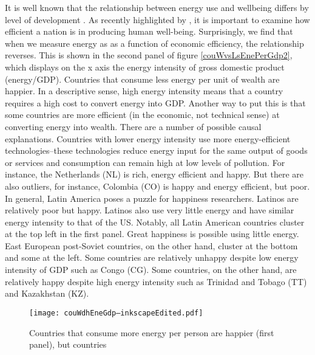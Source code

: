 \documentclass[10pt, letterpaper]{article}
\begin{document}
\begin{spacing}{1.0}
It is well known that the relationship between energy use and wellbeing differs
by level of development \citep[e.g.,][]{jorgenson15b,knight11}.
As recently highlighted by \citet{dietz09}, it is important to examine
how efficient a nation is in  producing human well-being.
%
Surprisingly,  we find that when we measure energy as as a function of economic
efficiency, the relationship reverses.  This is shown in the second panel of
figure \ref{couWvsLsEnePerGdp2}, which displays on the x axis the energy intensity of gross domestic product (energy/GDP). Countries that consume less energy per unit of wealth are happier. 
%
In a descriptive sense, high energy intensity means that a country requires
a high cost to convert energy into GDP. Another way to put this is that some
countries are more efficient (in the economic, not technical sense) at
converting energy into wealth. There are a number of possible causal explanations.  Countries with lower energy intensity  use
 more energy-efficient technologies--these technologies reduce energy input 
for the same output of goods or services and consumption can remain high at low
levels of pollution.
 For instance,  the Netherlands (NL) is rich,  energy efficient and happy. But
 there are also outliers, for instance,  Colombia (CO) is  happy and energy
 efficient,  but poor.  
In general, Latin America poses a puzzle for happiness researchers. Latinos are
relatively poor but happy. Latinos also use very little  energy and have similar energy intensity to that of the  US. Notably, all Latin
 American countries cluster at the top left in the
first panel.  Great happiness is possible using little  energy. East European
post-Soviet countries, on the other hand, cluster at the bottom and some at the
left. Some countries are relatively unhappy despite low energy intensity of GDP such as Congo (CG). Some countries, on the other hand, are relatively happy
despite high energy intensity such as Trinidad and Tobago (TT) and Kazakhstan (KZ).    
\begin{figure}[H]
 \texttt{[image: couWdhEneGdp--inkscapeEdited.pdf]}\centering \caption{Countries
   that consume more energy per person are happier (first panel), but countries
}
\end{figure}
\end{spacing}
\end{document}
